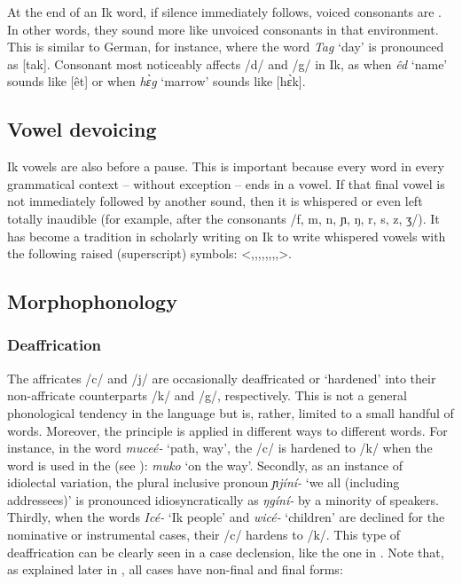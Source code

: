 At the end of an Ik word, if silence immediately follows, voiced consonants are . In other words, they sound more like unvoiced consonants in that environment. This is similar to German, for instance, where the word \textit{Tag} ‘day’ is pronounced as [tak]. Consonant  most noticeably affects /d/ and /g/ in Ik, as when \textit{êd} ‘name’ sounds like [êt] or when \textit{h\`{ɛ}g} ‘marrow’ sounds like [h\`{ɛ}k]. 
 
\subsection{Vowel devoicing}\label{sec:2.3}


Ik vowels are also  before a pause. This is important because every word in every grammatical context – without exception – ends in a vowel. If that final vowel is not immediately followed by another sound, then it is whispered or even left totally inaudible (for example, after the consonants /f, m, n, ɲ, ŋ, r, s, z, ʒ/). It has become a tradition in scholarly writing on Ik to write whispered vowels with the following raised (superscript) symbols: <\ⁱ,\ᶤ,\ᵉ,\ᵋ,\ᵃ,\ᵓ,\ᵒ,\ᶶ,\ᵘ>.

\subsection{Morphophonology}\label{sec:2.4}
\subsubsection{Deaffrication}\label{sec:2.4.1}

The affricates /c/ and /j/ are occasionally deaffricated or ‘hardened’ into their non-affricate counterparts /k/ and /g/, respectively. This is not a general phonological tendency in the language but is, rather, limited to a small handful of words. Moreover, the principle is applied in different ways to different words. For instance, in the word \textit{muceé-} ‘path, way’, the /c/ is hardened to /k/ when the word is used in the  (see ): \textit{muko} ‘on the way’. Secondly, as an instance of idiolectal variation, the plural inclusive pronoun \textit{ɲjíní-} ‘we all (including addressees)’ is pronounced idiosyncratically as \textit{ŋgíní-} by a minority of speakers. Thirdly, when the words \textit{Icé-} ‘Ik people’ and \textit{wicé-} ‘children’ are declined for the nominative or instrumental cases, their /c/ hardens to /k/. This type of deaffrication can be clearly seen in a case declension, like the one in . Note that, as explained later in , all cases have non-final and final forms:


